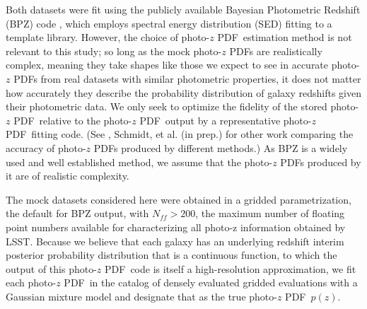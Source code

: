 \documentclass[\docopts]{\docclass}
\newcommand{\pz}{photo-$z$ PDF}
\begin{document}
Both datasets were fit using the publicly available Bayesian Photometric 
Redshift (BPZ) code \citep{benitez_bayesian_2000}, which employs spectral 
energy distribution (SED) fitting to a template library.  However, the choice 
of \pz\ estimation method is not relevant to this study; so long as the mock 
\pz s are realistically complex, meaning they take shapes like those we expect 
to see in accurate \pz s from real datasets with similar photometric 
properties, it does not matter how accurately they describe the probability 
distribution of galaxy redshifts given their photometric data.  We only seek to 
optimize the fidelity of the stored \pz\ relative to the \pz\ output by a 
representative \pz\ fitting code.  (See \citet{tanaka_photometric_2017}, 
Schmidt, et al. (in prep.) for other work comparing the accuracy of \pz s 
produced by different methods.)  As BPZ is a widely used and well established 
method, we assume that the \pz s produced by it are of realistic complexity.

The mock datasets considered here were obtained in a gridded parametrization, 
the default for BPZ output, with $N_{ff}>200$, the maximum number of floating 
point numbers available for characterizing all photo-z information obtained by 
LSST.  \citep{juric_data_2017}  Because we believe that each galaxy has an 
underlying redshift interim posterior probability distribution that is a 
continuous function, to which the output of this \pz\ code is itself a 
high-resolution approximation, we fit each \pz\ in the catalog of densely 
evaluated gridded evaluations with a Gaussian mixture model and designate that 
as the true \pz\ $p(z)$.
\end{document}
